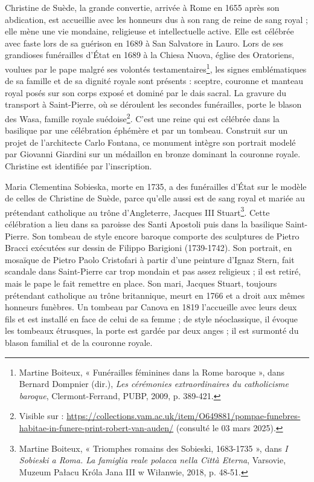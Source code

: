 \documentclass[12pt,twoside,openany]{book}
\begin{document}
Christine de Suède, la grande convertie, arrivée à Rome en 1655 après son abdication, est accueillie avec les honneurs dus à son rang de reine de sang royal ; elle mène une vie mondaine, religieuse et intellectuelle active. Elle est célébrée avec faste lors de sa guérison en 1689 à San Salvatore in Lauro. Lors de ses grandioses funérailles d’État en 1689 à la Chiesa Nuova, église des Oratoriens, voulues par le pape malgré ses volontés testamentaires\footnote{Martine Boiteux, « Funérailles féminines dans la Rome baroque », dans Bernard Dompnier (dir.), \textit{Les cérémonies extraordinaires du catholicisme baroque}, Clermont-Ferrand, PUBP, 2009, p. 389-421.}, les signes emblématiques de sa famille et de sa dignité royale sont présents : sceptre, couronne et manteau royal posés sur son corps exposé et dominé par le dais sacral. La gravure du transport à Saint-Pierre, où se déroulent les secondes funérailles, porte le blason des Wasa, famille royale suédoise\footnote{Visible sur : \href{https://collections.vam.ac.uk/item/O649881/pompae-funebres-habitae-in-funere-print-robert-van-auden/}{https://collections.vam.ac.uk/item/O649881/pompae-funebres-habitae-in-funere-print-robert-van-auden/} (consulté le 03 mars 2025).}. C’est une reine qui est célébrée dans la basilique par une célébration éphémère et par un tombeau. Construit sur un projet de l’architecte Carlo Fontana, ce monument intègre son portrait modelé par Giovanni Giardini sur un médaillon en bronze dominant la couronne royale. Christine est identifiée par l’inscription.

Maria Clementina Sobieska, morte en 1735, a des funérailles d’État sur le modèle de celles de Christine de Suède, parce qu’elle aussi est de sang royal et mariée au prétendant catholique au trône d’Angleterre, Jacques III Stuart\footnote{Martine Boiteux, « Triomphes romains des Sobieski, 1683-1735 », dans \textit{I Sobieski a Roma. La famiglia reale polacca nella Città Eterna}, Varsovie, Muzeum Pałacu Króla Jana III w Wiłanwie, 2018, p. 48-51.}. Cette célébration a lieu dans sa paroisse des Santi Apostoli puis dans la basilique Saint-Pierre. Son tombeau de style encore baroque comporte des sculptures de Pietro Bracci exécutées sur dessin de Filippo Barigioni (1739-1742). Son portrait, en mosaïque de Pietro Paolo Cristofari à partir d’une peinture d’Ignaz Stern, fait scandale dans Saint-Pierre car trop mondain et pas assez religieux ; il est retiré, mais le pape le fait remettre en place. Son mari, Jacques Stuart, toujours prétendant catholique au trône britannique, meurt en 1766 et a droit aux mêmes honneurs funèbres. Un tombeau par Canova en 1819 l’accueille avec leurs deux fils et est installé en face de celui de sa femme ; de style néoclassique, il évoque les tombeaux étrusques, la porte est gardée par deux anges ; il est surmonté du blason familial et de la couronne royale.
\end{document}
